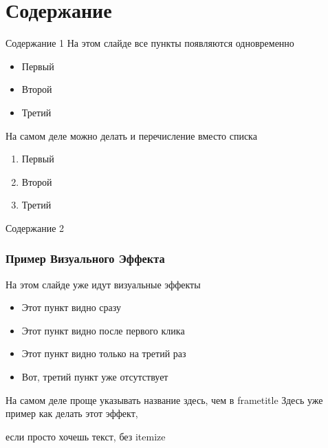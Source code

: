 \documentclass[11pt]{beamer} %
\begin{document}
\section{Содержание}
    \begin{frame}{Содержание 1}
        \centering
	{\large На этом слайде все пункты появляются одновременно}

        \begin{itemize}
            \item Первый

            \item Второй

            \item Третий
        \end{itemize}

        {\large На самом деле можно делать и перечисление вместо списка}
        \begin{enumerate}
            \item Первый

            \item Второй

            \item Третий
        \end{enumerate}
    \end{frame}
    \begin{frame}{Содержание 2}
        \frametitle{Пример Визуального Эффекта}
            \centering
            {\large На этом слайде уже идут визуальные эффекты}
            \smallbreak

        \begin{itemize}
            \item<1-> Этот пункт видно сразу
            \item<2-> Этот пункт видно после первого клика
            \item<3> Этот пункт видно только на третий раз
            \item<4-> Вот, третий пункт уже отсутствует
        \end{itemize}
    \end{frame}
    \begin{frame}{На самом деле проще указывать название здесь, чем в frametitle}
        Здесь уже пример \pause
        как делать этот эффект, \pause
        
        если просто хочешь текст, без itemize
    \end{frame}
\end{document}
